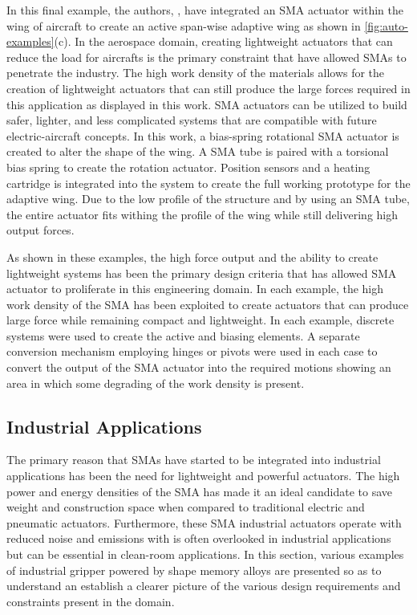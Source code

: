 In this final example, the authors, \cite{benafanRecentAdvancementsRotary2019a}, have integrated an SMA actuator within the wing of aircraft to create an active span-wise adaptive wing as shown in \cref{fig:auto-examples}(c). In the aerospace domain, creating lightweight actuators that can reduce the load for aircrafts is the primary constraint that have allowed SMAs to penetrate the industry. The high work density of the materials allows for the creation of lightweight actuators that can still produce the large forces required in this application as displayed in this work. SMA actuators can be utilized to build safer, lighter, and less complicated systems that are compatible with future electric-aircraft concepts. In this work, a bias-spring rotational SMA actuator is created to alter the shape of the wing. A SMA tube is paired with a torsional bias spring to create the rotation actuator. Position sensors and a heating cartridge is integrated into the system to create the full working prototype for the adaptive wing. Due to the low profile of the structure and by using an SMA tube, the entire actuator fits withing the profile of the wing while still delivering high output forces.

As shown in these examples, the high force output and the ability to create lightweight systems has been the primary design criteria that has allowed SMA actuator to proliferate in this engineering domain. In each example, the high work density of the SMA has been exploited to create actuators that can produce large force while remaining compact and lightweight. In each example, discrete systems were used to create the active and biasing elements. A separate conversion mechanism employing hinges or pivots were used in each case to convert the output of the SMA actuator into the required motions showing an area in which some degrading of the work density is present.

\subsection{Industrial Applications}
The primary reason that SMAs have started to be integrated into industrial applications has been the need for lightweight and powerful actuators. The high power and energy densities of the SMA has made it an ideal candidate to save weight and construction space when compared to traditional electric and pneumatic actuators. Furthermore, these SMA industrial actuators operate with reduced noise and emissions with is often overlooked in industrial applications but can be essential in clean-room applications. In this section, various examples of industrial gripper powered by shape memory alloys are presented so as to understand an establish a clearer picture of the various design requirements and constraints present in the domain.

